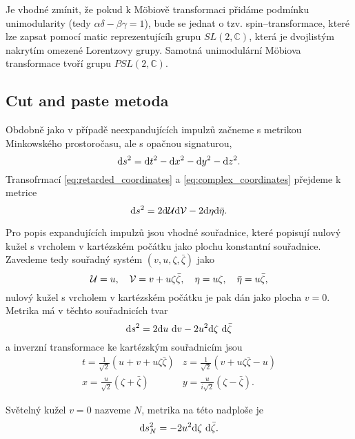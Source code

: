 Je vhodné zmínit, že pokud k Möbiově transformaci přidáme podmínku unimodularity (tedy $\alpha \delta - \beta \gamma = 1$),
bude se jednat o tzv. spin--transformace, které lze zapsat pomocí matic reprezentujícíh grupu $SL(2,\mathbb{C})$, která je dvojlistým nakrytím
omezené Lorentzovy grupy. Samotná unimodulární Möbiova transformace tvoří grupu $PSL(2, \mathbb{C})$.

\subsection{Cut and paste metoda}
Obdobně jako v případě neexpandujících impulzů začneme s metrikou Minkowského prostoročasu, ale s opačnou signaturou,
\begin{equation}
    \mathrm{d} s^2 = \mathrm{d} t^2 - \mathrm{d} x^2 - \mathrm{d} y^2 - \mathrm{d} z^2.
\end{equation}
Transofrmací \eqref{eq:retarded_coordinates} a \eqref{eq:complex_coordinates} přejdeme
k metrice
\begin{equation}
    \mathrm{d} s^2 = 2 \mathrm{d} \mathcal{U} \mathrm{d} \mathcal{V} - 2 \mathrm{d} \eta \mathrm{d} \bar{\eta}.
\end{equation}

Pro popis expandujících impulzů jsou vhodné souřadnice, které popisují nulový kužel s
vrcholem v kartézském počátku jako plochu konstantní souřadnice. Zavedeme tedy
souřadný systém $(v, u, \zeta, \bar{\zeta})$ jako
\begin{equation}
    \label{eq:expanding_null_tetrad}
    \mathcal{U} = u,~~~ \mathcal{V} = v + u \zeta \bar{\zeta}, ~~~ \eta = u \zeta, ~~~ \bar{\eta} = u \bar{\zeta},
\end{equation}
nulový kužel s vrcholem v kartézském počátku je pak dán jako plocha $v=0$. Metrika má v těchto souřadnicích tvar
\begin{equation}
    \label{eq:metric_stereographic_null}
    \mathrm{d} s^2 = 2 \mathrm{d} u ~ \mathrm{d} v - 2 u^2 \mathrm{d} \zeta ~ \mathrm{d} \bar{\zeta}
\end{equation}
a inverzní transformace ke kartézským souřadnicím jsou
\begin{align}
    t = \frac{1}{\sqrt{2}} \left(u + v + u \zeta \bar{\zeta}\right) & z = \frac{1}{\sqrt{2}} \left(v + u \zeta \bar{\zeta} - u\right) \\
    x = \frac{u}{\sqrt{2}} (\zeta + \bar{\zeta}) & y = \frac{u}{i \sqrt{2}} (\zeta - \bar{\zeta}).
\end{align}

Světelný kužel $v=0$ nazveme $N$, metrika na této nadploše je
\begin{equation}
    \label{eq:null_cone_metric}
    \mathrm{d} s_N^2 = -2 u^2 \mathrm{d} \zeta ~ \mathrm{d} \bar{\zeta}.
\end{equation}


